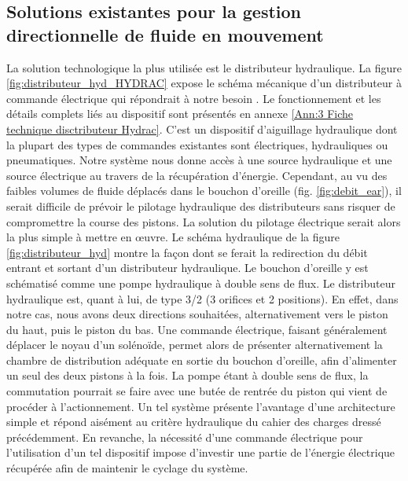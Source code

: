 	\subsection{Solutions existantes pour la gestion directionnelle de fluide en mouvement}
	\label{subsec:2.2.2_Solutions existantes pour la gestion directionnelle de fluide en mouvement}
La solution technologique la plus utilisée est le distributeur hydraulique. La figure \ref{fig:distributeur_hyd_HYDRAC} expose le schéma mécanique d'un distributeur à commande électrique qui répondrait à notre besoin \cite{HYDRACINTERNATIONAL2022}. Le fonctionnement et les détails complets liés au dispositif sont présentés en annexe \ref{Ann:3 Fiche technique disctributeur Hydrac}. C'est un dispositif d'aiguillage hydraulique dont la plupart des types de commandes existantes sont électriques, hydrauliques ou pneumatiques. Notre système nous donne accès à une source hydraulique et une source électrique au travers de la récupération d'énergie. Cependant, au vu des faibles volumes de fluide déplacés dans le bouchon d'oreille (fig. \ref{fig:debit_ear}), il serait difficile de prévoir le pilotage hydraulique des distributeurs sans risquer de compromettre la course des pistons. La solution du pilotage électrique serait alors la plus simple à mettre en \oe{}uvre. Le schéma hydraulique de la figure \ref{fig:distributeur_hyd} montre la façon dont se ferait la redirection du débit entrant et sortant d'un distributeur hydraulique. Le bouchon d'oreille y est schématisé comme une pompe hydraulique à double sens de flux. Le distributeur hydraulique est, quant à lui, de type 3/2 (3 orifices et 2 positions). En effet, dans notre cas, nous avons deux directions souhaitées, alternativement vers le piston du haut, puis le piston du bas. Une commande électrique, faisant généralement déplacer le noyau d'un solénoïde, permet alors de présenter alternativement la chambre de distribution adéquate en sortie du bouchon d'oreille, afin d'alimenter un seul des deux pistons à la fois. La pompe étant à double sens de flux, la commutation pourrait se faire avec une butée de rentrée du piston qui vient de procéder à l'actionnement. Un tel système présente l'avantage d'une architecture simple et répond aisément au critère hydraulique du cahier des charges dressé précédemment. En revanche, la nécessité d'une commande électrique pour l'utilisation d'un tel dispositif impose d'investir une partie de l'énergie électrique récupérée afin de maintenir le cyclage du système. 
